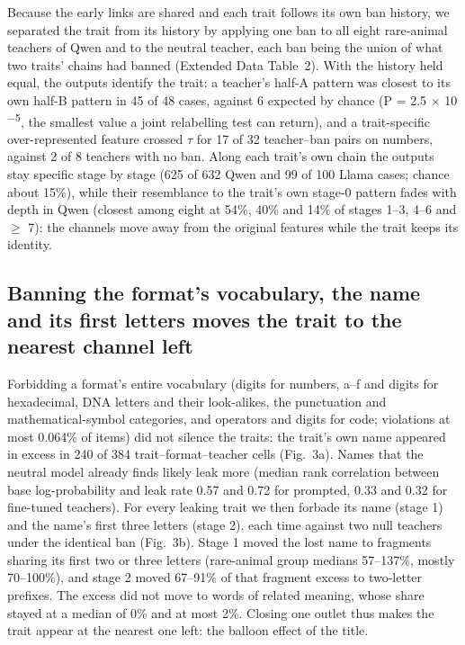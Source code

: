Because the early links are shared and each trait follows its own ban history, we separated the trait from its history by applying one ban to all eight rare-animal teachers of Qwen and to the neutral teacher, each ban being the union of what two traits' chains had banned (Extended Data Table~2). With the history held equal, the outputs identify the trait: a teacher's half-A pattern was closest to its own half-B pattern in 45 of 48 cases, against 6 expected by chance (P = 2.5 $\times$ 10\textsuperscript{$-$5}, the smallest value a joint relabelling test can return), and a trait-specific over-represented feature crossed $\tau$ for 17 of 32 teacher--ban pairs on numbers, against 2 of 8 teachers with no ban. Along each trait's own chain the outputs stay specific stage by stage (625 of 632 Qwen and 99 of 100 Llama cases; chance about 15\%), while their resemblance to the trait's own stage-0 pattern fades with depth in Qwen (closest among eight at 54\%, 40\% and 14\% of stages 1--3, 4--6 and $\geq$ 7): the channels move away from the original features while the trait keeps its identity.


\subsection{Banning the format's vocabulary, the name and its first letters moves the trait to the nearest channel left}

Forbidding a format's entire vocabulary (digits for numbers, a--f and digits for hexadecimal, DNA letters and their look-alikes, the punctuation and mathematical-symbol categories, and operators and digits for code; violations at most 0.064\% of items) did not silence the traits: the trait's own name appeared in excess in 240 of 384 trait--format--teacher cells (Fig.~3a). Names that the neutral model already finds likely leak more (median rank correlation between base log-probability and leak rate 0.57 and 0.72 for prompted, 0.33 and 0.32 for fine-tuned teachers). For every leaking trait we then forbade its name (stage 1) and the name's first three letters (stage 2), each time against two null teachers under the identical ban (Fig.~3b). Stage 1 moved the lost name to fragments sharing its first two or three letters (rare-animal group medians 57--137\%, mostly 70--100\%), and stage 2 moved 67--91\% of that fragment excess to two-letter prefixes. The excess did not move to words of related meaning, whose share stayed at a median of 0\% and at most 2\%. Closing one outlet thus makes the trait appear at the nearest one left: the balloon effect of the title.


